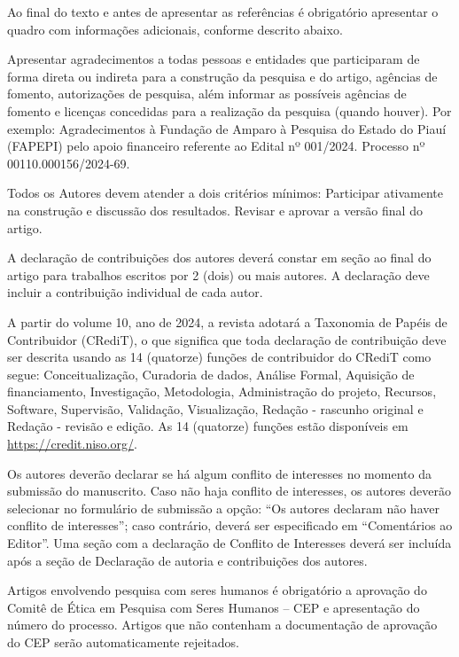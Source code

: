 
Ao final do texto e antes de apresentar as referências é obrigatório apresentar o quadro com informações adicionais, conforme descrito abaixo.

Apresentar agradecimentos a todas pessoas e entidades que participaram de forma direta ou indireta para a construção da pesquisa e do artigo, agências de fomento, autorizações de pesquisa, além informar as possíveis agências de fomento e licenças concedidas para a realização da pesquisa (quando houver). Por exemplo: Agradecimentos à Fundação de Amparo à Pesquisa do Estado do Piauí (FAPEPI) pelo apoio financeiro referente ao Edital nº 001/2024. Processo nº 00110.000156/2024-69.

Todos os Autores devem atender a dois critérios mínimos:
Participar ativamente na construção e discussão dos resultados.
Revisar e aprovar a versão final do artigo.

A declaração de contribuições dos autores deverá constar em seção ao final do artigo para trabalhos escritos por 2 (dois) ou mais autores. A declaração deve incluir a contribuição individual de cada autor.

A partir do volume 10, ano de 2024, a revista adotará a Taxonomia de Papéis de Contribuidor (CRediT), o que significa que toda declaração de contribuição deve ser descrita usando as 14 (quatorze) funções de contribuidor do CRediT como segue: Conceitualização, Curadoria de dados, Análise Formal, Aquisição de financiamento, Investigação, Metodologia, Administração do projeto, Recursos, Software, Supervisão, Validação, Visualização, Redação - rascunho original e Redação - revisão e edição. As 14 (quatorze) funções estão disponíveis em \url{https://credit.niso.org/}.

Os autores deverão declarar se há algum conflito de interesses no momento da submissão do manuscrito. Caso não haja conflito de interesses, os autores deverão selecionar no formulário de submissão a opção: ``Os autores declaram não haver conflito de interesses''; caso contrário, deverá ser especificado em ``Comentários ao Editor''. Uma seção com a declaração de Conflito de Interesses deverá ser incluída após a seção de Declaração de autoria e contribuições dos autores.

Artigos envolvendo pesquisa com seres humanos é obrigatório a aprovação do Comitê de Ética em Pesquisa com Seres Humanos – CEP e apresentação do número do processo. Artigos que não contenham a documentação de aprovação do CEP serão automaticamente rejeitados.

